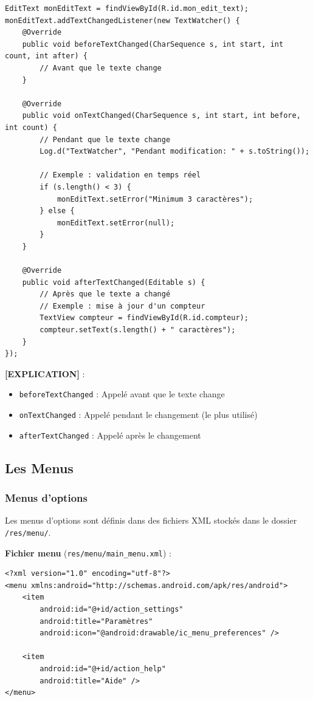 \documentclass[11pt,a4paper]{article}
\begin{document}
\begin{lstlisting}
EditText monEditText = findViewById(R.id.mon_edit_text);
monEditText.addTextChangedListener(new TextWatcher() {
    @Override
    public void beforeTextChanged(CharSequence s, int start, int count, int after) {
        // Avant que le texte change
    }
    
    @Override
    public void onTextChanged(CharSequence s, int start, int before, int count) {
        // Pendant que le texte change
        Log.d("TextWatcher", "Pendant modification: " + s.toString());
        
        // Exemple : validation en temps réel
        if (s.length() < 3) {
            monEditText.setError("Minimum 3 caractères");
        } else {
            monEditText.setError(null);
        }
    }
    
    @Override
    public void afterTextChanged(Editable s) {
        // Après que le texte a changé
        // Exemple : mise à jour d'un compteur
        TextView compteur = findViewById(R.id.compteur);
        compteur.setText(s.length() + " caractères");
    }
});
\end{lstlisting}

\textbf{[EXPLICATION]} :
\begin{itemize}
    \item \texttt{beforeTextChanged} : Appelé avant que le texte change
    \item \texttt{onTextChanged} : Appelé pendant le changement (le plus utilisé)
    \item \texttt{afterTextChanged} : Appelé après le changement
\end{itemize}

\subsection{Les Menus}

\subsubsection{Menus d'options}

Les menus d'options sont définis dans des fichiers XML stockés dans le dossier \texttt{/res/menu/}.

\textbf{Fichier menu} (\texttt{res/menu/main\_menu.xml}) :
\begin{lstlisting}[style=XML]
<?xml version="1.0" encoding="utf-8"?>
<menu xmlns:android="http://schemas.android.com/apk/res/android">
    <item
        android:id="@+id/action_settings"
        android:title="Paramètres"
        android:icon="@android:drawable/ic_menu_preferences" />
    
    <item
        android:id="@+id/action_help"
        android:title="Aide" />
</menu>
\end{lstlisting}
\end{document}

